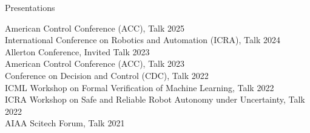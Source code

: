 \begin{rSection}{Presentations}
    
    American Control Conference (ACC), Talk \hfill {2025}\\
    International Conference on Robotics and Automation (ICRA), Talk \hfill {2024}\\
    Allerton Conference, Invited Talk \hfill {2023}\\
    American Control Conference (ACC), Talk \hfill {2023}\\
    Conference on Decision and Control (CDC), Talk \hfill {2022}\\
    ICML Workshop on Formal Verification of Machine Learning, Talk \hfill {2022}\\
    ICRA Workshop on Safe and Reliable Robot Autonomy under Uncertainty, Talk \hfill {2022}\\
    AIAA Scitech Forum, Talk \hfill {2021}\\

\end{rSection}